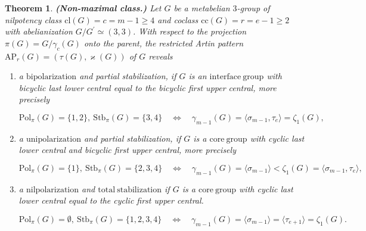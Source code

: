 \documentclass{amsart}
\newtheorem{theorem}{Theorem}[section]
\theoremstyle{definition}
\numberwithin{equation}{section}
\begin{document}
\begin{theorem}
\label{thm:NonMaxClass}
\textbf{(Non-maximal class.)}
Let \(G\) be a metabelian \(3\)-group
of nilpotency class \(\mathrm{cl}(G)=c=m-1\ge 4\) and coclass \(\mathrm{cc}(G)=r=e-1\ge 2\)
with abelianization \(G/G^\prime\simeq (3,3)\).
With respect to the projection \(\pi(G)=G/\gamma_c(G)\) onto the parent,
the restricted Artin pattern \(\mathrm{AP}_r(G)=(\tau(G),\varkappa(G))\) of \(G\) reveals

\begin{enumerate}

\item
a \(\mathrm{bipolarization}\) and partial stabilization,
if \(G\) is an \(\mathrm{interface\ group}\) with
bicyclic last lower central equal to the bicyclic first upper central,
more precisely

\begin{equation}
\label{eqn:BiPol}
\mathrm{Pol}_{\pi}(G)=\lbrace 1,2\rbrace,\ \mathrm{Stb}_{\pi}(G)=\lbrace 3,4\rbrace
\quad\Longleftrightarrow\quad
\gamma_{m-1}(G)=\langle\sigma_{m-1},\tau_{e}\rangle=\zeta_1(G),
\end{equation}

\item
a \(\mathrm{unipolarization}\) and partial stabilization,
if \(G\) is a \(\mathrm{core\ group}\) with
cyclic last lower central and bicyclic first upper central,
more precisely

\begin{equation}
\label{eqn:UniPol}
\mathrm{Pol}_{\pi}(G)=\lbrace 1\rbrace,\ \mathrm{Stb}_{\pi}(G)=\lbrace 2,3,4\rbrace
\quad\Longleftrightarrow\quad
\gamma_{m-1}(G)=\langle\sigma_{m-1}\rangle<\zeta_1(G)=\langle\sigma_{m-1},\tau_{e}\rangle,
\end{equation}

\item
a \(\mathrm{nilpolarization}\) and \(\mathrm{total\ stabilization}\)
if \(G\) is a \(\mathrm{core\ group}\) with
cyclic last lower central equal to the cyclic first upper central.

\begin{equation}
\label{eqn:NilPol}
\mathrm{Pol}_{\pi}(G)=\emptyset,\ \mathrm{Stb}_{\pi}(G)=\lbrace 1,2,3,4\rbrace
\quad\Longleftrightarrow\quad
\gamma_{m-1}(G)=\langle\sigma_{m-1}\rangle=\langle\tau_{e+1}\rangle=\zeta_1(G).
\end{equation}

\end{enumerate}

\end{theorem}
\end{document}
